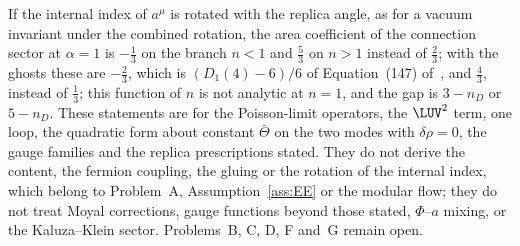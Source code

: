If the internal index of \(a^\mu\) is rotated with the replica angle, as for a vacuum invariant under the combined rotation, the area coefficient of the connection sector at \(\alpha=1\) is \(-\tfrac13\) on the branch \(n<1\) and \(\tfrac53\) on \(n>1\) instead of \(\tfrac23\); with the ghosts these are \(-\tfrac23\), which is \((D_1(4)-6)/6\) of Equation~(147) of~\cite{Solodukhin2011}, and \(\tfrac43\), instead of \(\tfrac13\); this function of \(n\) is not analytic at \(n=1\), and the gap is \(3-n_D\) or \(5-n_D\). These statements are for the Poisson-limit operators, the \(\LUV^2\) term, one loop, the quadratic form about constant \(\bar\Theta\) on the two modes with \(\delta\rho=0\), the gauge families and the replica prescriptions stated. They do not derive the content, the fermion coupling, the gluing or the rotation of the internal index, which belong to Problem~A, Assumption~\ref{ass:EE} or the modular flow; they do not treat Moyal corrections, gauge functions beyond those stated, \(\Phi\)--\(a\) mixing, or the Kaluza--Klein sector. Problems~B, C, D, F and~G remain open.
